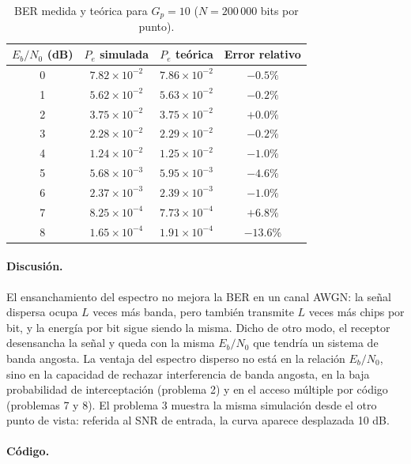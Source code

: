 \documentclass[11pt,a4paper]{article}
\newcommand{\listado}[1]{%
  \VerbatimInput[fontsize=\scriptsize,breaklines=true,breakanywhere=true,
    frame=single,framesep=2pt,rulecolor=\color{gray!50},numbers=left,
    numbersep=4pt]{#1}}
\begin{document}
\begin{table}[H]
  \centering
  \caption{BER medida y teórica para $G_p=10$ ($N=200\,000$ bits por punto).}
  \label{tab:p01}
  \begin{tabular}{@{}cccc@{}}
    \toprule
    $E_b/N_0$ (dB) & $P_e$ simulada & $P_e$ teórica & Error relativo \\
    \midrule
    0 & $7.82\times10^{-2}$ & $7.86\times10^{-2}$ & $-0.5\%$ \\
    1 & $5.62\times10^{-2}$ & $5.63\times10^{-2}$ & $-0.2\%$ \\
    2 & $3.75\times10^{-2}$ & $3.75\times10^{-2}$ & $+0.0\%$ \\
    3 & $2.28\times10^{-2}$ & $2.29\times10^{-2}$ & $-0.2\%$ \\
    4 & $1.24\times10^{-2}$ & $1.25\times10^{-2}$ & $-1.0\%$ \\
    5 & $5.68\times10^{-3}$ & $5.95\times10^{-3}$ & $-4.6\%$ \\
    6 & $2.37\times10^{-3}$ & $2.39\times10^{-3}$ & $-1.0\%$ \\
    7 & $8.25\times10^{-4}$ & $7.73\times10^{-4}$ & $+6.8\%$ \\
    8 & $1.65\times10^{-4}$ & $1.91\times10^{-4}$ & $-13.6\%$ \\
    \bottomrule
  \end{tabular}
\end{table}

\paragraph{Discusión.} El ensanchamiento del espectro no mejora la BER en un
canal AWGN: la señal dispersa ocupa $L$ veces más banda, pero también transmite
$L$ veces más chips por bit, y la energía por bit sigue siendo la misma. Dicho
de otro modo, el receptor desensancha la señal y queda con la misma
$E_b/N_0$ que tendría un sistema de banda angosta. La ventaja del espectro
disperso no está en la relación $E_b/N_0$, sino en la capacidad de rechazar
interferencia de banda angosta, en la baja probabilidad de interceptación
(problema 2) y en el acceso múltiple por código (problemas 7 y 8). El problema 3
muestra la misma simulación desde el otro punto de vista: referida al SNR de
entrada, la curva aparece desplazada 10 dB.

\paragraph{Código.}
\listado{problema01.m}
\end{document}
